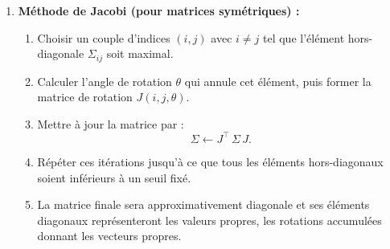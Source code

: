 \documentclass[a4paper,12pt]{report}
\begin{document}
\begin{enumerate}
    \item \textbf{Méthode de Jacobi (pour matrices symétriques) :}
    \begin{enumerate}
        \item Choisir un couple d'indices \((i,j)\) avec \(i\neq j\) tel que l'élément hors-diagonale \(\Sigma_{ij}\) soit maximal.
        \item Calculer l'angle de rotation \(\theta\) qui annule cet élément, puis former la matrice de rotation \(J(i,j,\theta)\).
        \item Mettre à jour la matrice par :
        \[
        \Sigma \leftarrow J^\top\, \Sigma\, J.
        \]
        \item Répéter ces itérations jusqu'à ce que tous les éléments hors-diagonaux soient inférieurs à un seuil fixé.
        \item La matrice finale sera approximativement diagonale et ses éléments diagonaux représenteront les valeurs propres, les rotations accumulées donnant les vecteurs propres.
    \end{enumerate}
\end{enumerate}
\end{document}

